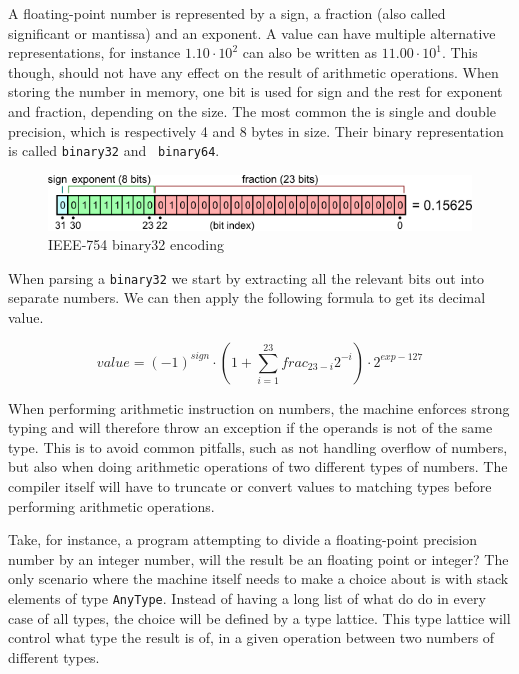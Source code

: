 A floating-point number is represented by a sign, a fraction (also called
significant or mantissa) and an exponent. A value can have multiple alternative
representations, for instance $1.10 \cdot 10^2$ can also be written as
$11.00 \cdot 10^1$. This though, should not have any effect on the result of
arithmetic operations. When storing the number in memory, one bit is used for
sign and the rest for exponent and fraction, depending on the size. The most
common the is single and double precision, which is respectively 4 and 8 bytes
in size. Their binary representation is called {\tt binary32} and {\tt
  binary64}.

\begin{figure}[H]
  \centering
  \includegraphics[scale=0.7]{images/ieee32.png}
  \caption[Caption for LOF]{IEEE-754 binary32 encoding\footnotemark}
\end{figure}

When parsing a {\tt binary32} we start by extracting all the relevant bits out
into separate numbers. We can then apply the following formula to get its
decimal value.

\begin{equation}
  value = (-1)^{sign} \cdot (1 + \sum^{23}_{i=1} frac_{23-i}2^{-i}) \cdot 2^{exp - 127}
\end{equation}


When performing arithmetic instruction on numbers, the machine enforces strong
typing and will therefore throw an exception if the operands is not of the same
type. This is to avoid common pitfalls, such as not handling overflow of
numbers, but also when doing arithmetic operations of two different types of
numbers. The compiler itself will have to truncate or convert values to matching
types before performing arithmetic operations.

Take, for instance, a program attempting to divide a floating-point precision
number by an integer number, will the result be an floating point or integer?
The only scenario where the machine itself needs to make a choice about is with
stack elements of type {\tt AnyType}. Instead of having a long list of what do
do in every case of all types, the choice will be defined by a type
lattice. This type lattice will control what type the result is of, in a given
operation between two numbers of different types.

